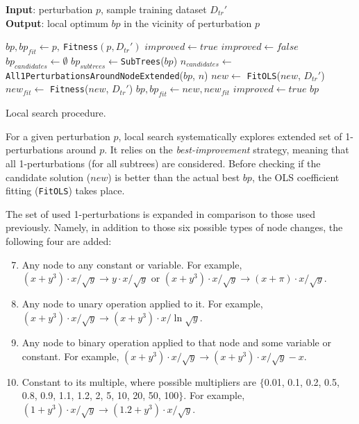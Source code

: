 \documentclass{bmcart}
\begin{document}
\begin{algorithm}
	\hspace*{\algorithmicindent} \textbf{Input}: perturbation $p$, sample training dataset $D_{tr}'$ \\
	\hspace*{\algorithmicindent} \textbf{Output}: local optimum $bp$ in the vicinity of perturbation $p$
	\begin{algorithmic}[1] 
		\State $bp, bp_{fit} \gets p,\ $\texttt{Fitness}$(p,D_{tr}')$ 
		\State $improved \gets true$
		\State $improved \gets false$
		\State $bp_{candidates} \gets \emptyset$
		\State $bp_{subtrees} \gets $\texttt{SubTrees}($bp$)
		\State $n_{candidates} \gets $ \texttt{All1PerturbationsAroundNodeExtended}($bp$, $n$)
		\State $new \gets$ \texttt{FitOLS}($new$, $D_{tr}'$)
		\State $new_{fit} \gets$ \texttt{Fitness}($new$, $D_{tr}'$)
		\State $bp, bp_{fit} \gets new, new_{fit}$
		\State $improved \gets true$
		\EndIf
		\EndFor
		\EndFor
		\EndWhile
		\State \Return $bp$
		\EndProcedure
	\end{algorithmic}
	\caption{Local search procedure.}
	\label{alg:ls}
\end{algorithm}  

For a given perturbation $p$, local search systematically explores extended set of 1-perturbations around $p$. It relies on the \emph{best-improvement} strategy, meaning that all 1-perturbations (for all subtrees) are considered. Before checking if the candidate solution ($new$) is better than the actual best $bp$, the OLS coefficient fitting (\texttt{FitOLS}) takes place.  


The set of used 1-perturbations is expanded in comparison to those used previously. Namely, in addition to those six possible types of node changes, the following four are added:

\begin{enumerate}
	\setcounter{enumi}{6}
	\item Any node to any constant or variable. For example, $(x+y^3)\cdot x/\sqrt{y} \rightarrow y \cdot x / \sqrt{y}$ or  $(x+y^3)\cdot x/\sqrt{y} \rightarrow (x+\pi) \cdot x / \sqrt{y}$.
	\item Any node to unary operation applied to it. For example, $(x+y^3)\cdot x/\sqrt{y} \rightarrow (x+y^3)\cdot x/\ln{\sqrt{y}}$.
	\item Any node to binary operation applied to that node and some variable or constant. For example, $(x+y^3)\cdot x/\sqrt{y} \rightarrow (x+y^3)\cdot x/\sqrt{y} - x$.
	\item Constant to its multiple, where possible multipliers are $\{$0.01, 0.1, 0.2, 0.5, 0.8, 0.9, 1.1, 1.2, 2, 5, 10, 20, 50, 100$\}$. For example, $(1+y^3)\cdot x/\sqrt{y} \rightarrow (1.2+y^3)\cdot x/\sqrt{y}$.
\end{enumerate}
\end{document}
